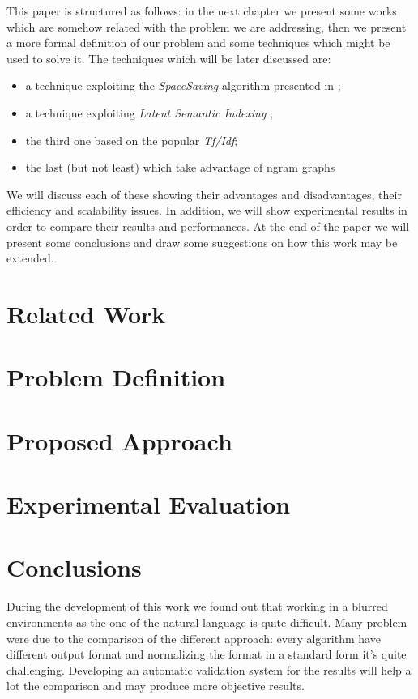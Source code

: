 \documentclass{acm_proc_article-sp-sigmod07}
\begin{document}
This paper is structured as follows: in the next chapter we present some works
which are somehow related with the problem we are addressing, then we present a more
formal definition of our problem and some techniques which might be
used to solve it. The techniques which will be later discussed are:
\begin{itemize}
	\item a technique exploiting the \emph{SpaceSaving} algorithm presented in
		\cite{SS};
	\item a technique exploiting \emph{Latent Semantic Indexing} \cite{LSA};
	\item the third one based on the popular \emph{Tf/Idf};
	\item the last (but not least) which take advantage of ngram graphs
		\cite{Ngram}
\end{itemize}
We will discuss each of these showing their advantages and
disadvantages, their efficiency and scalability issues. In addition, we will
show experimental results in order to compare their results and performances.
At the end of the paper we will present
some conclusions and draw some suggestions on how this work may be extended.

\section{Related Work}


\section{Problem Definition}


\section{Proposed Approach}


\section{Experimental Evaluation}


\section{Conclusions}
During the development of this work we found out that working in a blurred environments as the one of the natural language is quite difficult.
Many problem were due to the comparison of the different approach: every algorithm have different output format and normalizing the format in a standard form it's quite challenging. 
Developing an automatic validation system for the results will help a lot the comparison and may produce more objective results.
\end{document}
